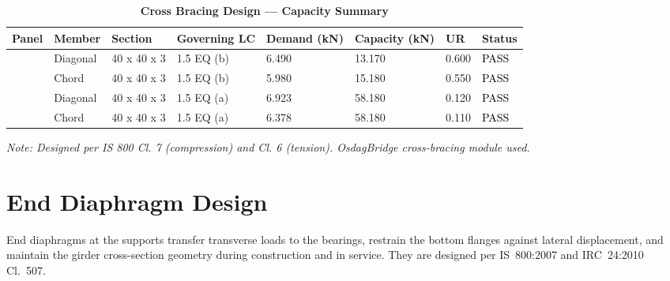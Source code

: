 \documentclass[12pt,a4paper]{report}
\numberwithin{table}{chapter}
\numberwithin{figure}{chapter}
\begin{document}
\vspace{1em}
\begin{longtable}{|C{2.0cm}|L{1.8cm}|C{2.2cm}|C{3.0cm}|C{1.8cm}|C{1.8cm}|C{1.2cm}|C{1.8cm}|}
\caption{\textbf{Cross Bracing Design --- Capacity Summary}}
\\
\hline
\textbf{Panel} & \textbf{Member} & \textbf{Section} & \textbf{Governing LC} & \textbf{Demand (kN)} & \textbf{Capacity (kN)} & \textbf{UR} & \textbf{Status} \\[6pt]
\hline
{} & Diagonal & 40 x 40 x 3 & 1.5 EQ (b) & 6.490 & 13.170 & 0.600 & \textcolor{black}{PASS} \\[6pt]
 & Chord & 40 x 40 x 3 & 1.5 EQ (b) & 5.980 & 15.180 & 0.550 & \textcolor{black}{PASS} \\[6pt]
\hline
{} & Diagonal & 40 x 40 x 3 & 1.5 EQ (a) & 6.923 & 58.180 & 0.120 & \textcolor{black}{PASS} \\[6pt]
 & Chord & 40 x 40 x 3 & 1.5 EQ (a) & 6.378 & 58.180 & 0.110 & \textcolor{black}{PASS} \\[6pt]
\hline
\end{longtable}
\noindent\textit{Note: Designed per IS 800 Cl. 7 (compression) and Cl. 6 (tension). OsdagBridge cross-bracing module used.}

\section{End Diaphragm Design}
\label{sec:end-diaphragm}

End diaphragms at the supports transfer transverse loads to the bearings, restrain the bottom flanges against lateral displacement, and maintain the girder cross-section geometry during construction and in service. They are designed per IS~800:2007 and IRC~24:2010 Cl.~507.

\vspace{1em}

\vspace{0.4em}
\noindent
\setlength{\tabcolsep}{4pt}
\setlength{\LTleft}{0pt}
\setlength{\LTright}{\fill}
\end{document}
